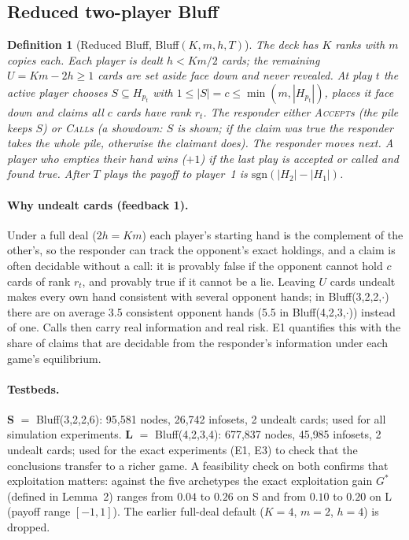 \documentclass[11pt]{article}
\newtheorem{definition}{Definition}
\newcommand{\new}[1]{\textcolor{blue!55!black}{#1}}
\begin{document}
\subsection{Reduced two-player Bluff}
\begin{definition}[Reduced Bluff, Bluff$(K,m,h,T)$]
The deck has $K$ ranks with $m$ copies each. \new{Each player is dealt $h<Km/2$ cards; the remaining $U=Km-2h\ge 1$ cards are set aside face down and never revealed.} At play $t$ the active player chooses $S\subseteq H_{p_t}$ with $1\le|S|=c\le\min(m,|H_{p_t}|)$, places it face down and claims all $c$ cards have rank $r_t$. The responder either \textsc{Accept}s (the pile keeps $S$) or \textsc{Call}s (a showdown: $S$ is shown; if the claim was true the responder takes the whole pile, otherwise the claimant does). The responder moves next. A player who empties their hand wins ($+1$) if the last play is accepted or called and found true. After $T$ plays the payoff to player~1 is $\mathrm{sgn}(|H_2|-|H_1|)$.
\end{definition}
\new{\paragraph{Why undealt cards (feedback 1).} Under a full deal ($2h=Km$) each player's starting hand is the complement of the other's, so the responder can track the opponent's exact holdings, and a claim is often decidable without a call: it is provably false if the opponent cannot hold $c$ cards of rank $r_t$, and provably true if it cannot be a lie. Leaving $U$ cards undealt makes every own hand consistent with several opponent hands; in Bluff(3,2,2,$\cdot$) there are on average 3.5 consistent opponent hands (5.5 in Bluff(4,2,3,$\cdot$)) instead of one. Calls then carry real information and real risk. E1 quantifies this with the share of claims that are decidable from the responder's information under each game's equilibrium.}

\new{\paragraph{Testbeds.} \textbf{S} $=$ Bluff(3,2,2,6): 95{,}581 nodes, 26{,}742 infosets, 2 undealt cards; used for all simulation experiments. \textbf{L} $=$ Bluff(4,2,3,4): 677{,}837 nodes, 45{,}985 infosets, 2 undealt cards; used for the exact experiments (E1, E3) to check that the conclusions transfer to a richer game. A feasibility check on both confirms that exploitation matters: against the five archetypes the exact exploitation gain $G^*$ (defined in Lemma~2) ranges from $0.04$ to $0.26$ on S and from $0.10$ to $0.20$ on L (payoff range $[-1,1]$). The earlier full-deal default ($K{=}4$, $m{=}2$, $h{=}4$) is dropped.}
\end{document}
